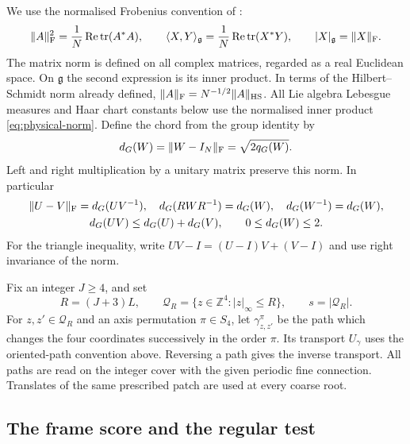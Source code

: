 \documentclass[11pt,reqno]{amsart}
\numberwithin{equation}{section}
\theoremstyle{definition}
\theoremstyle{remark}
\newcommand{\Z}{\mathbb Z}
\newcommand{\g}{\mathfrak g}
\DeclareMathOperator{\tr}{tr}
\begin{document}
We use the normalised Frobenius convention of
\cite[(7.1)--(7.3), p.~24]{Main}:
\begin{equation}
 \|A\|_{\rm F}^2=\frac1N\operatorname{Re}\tr(A^*A),\qquad
 \langle X,Y\rangle_{\g}=\frac1N\operatorname{Re}\tr(X^*Y),
 \qquad |X|_{\g}=\|X\|_{\rm F}.
 \label{eq:physical-norm}
\end{equation}
The matrix norm is defined on all complex matrices, regarded as a
real Euclidean space. On \(\g\) the second expression is its inner
product. In terms of the Hilbert--Schmidt norm already defined,
\(\|A\|_{\rm F}=N^{-1/2}\|A\|_{\rm HS}\).
All Lie algebra Lebesgue measures and Haar chart constants below
use the normalised inner product \eqref{eq:physical-norm}.
Define the chord from the group identity by
\begin{equation}
                  d_G(W)=\|W-I_N\|_{\rm F}=\sqrt{2q_G(W)}.
 \label{eq:chord}
\end{equation}
Left and right multiplication by a unitary matrix preserve this
norm. In particular
\begin{equation}
 \begin{gathered}
 \|U-V\|_{\rm F}=d_G(UV^{-1}),\quad
 d_G(RWR^{-1})=d_G(W),\quad d_G(W^{-1})=d_G(W),\\
 d_G(UV)\le d_G(U)+d_G(V),\qquad 0\le d_G(W)\le2.
 \end{gathered}
 \label{eq:chord-properties}
\end{equation}
For the triangle inequality, write \(UV-I=(U-I)V+(V-I)\)
and use right invariance of the norm.

Fix an integer \(J\ge4\), and set
\begin{equation}
       R=(J+3)L,\qquad
       \mathcal Q_R=\{z\in\Z^4:|z|_\infty\le R\},\qquad
       s=|\mathcal Q_R|.
 \label{eq:branch-patch}
\end{equation}
For \(z,z'\in\mathcal Q_R\) and an axis permutation
\(\pi\in S_4\), let \(\gamma^\pi_{z,z'}\) be the path which
changes the four coordinates successively in the order \(\pi\).
Its transport \(U_\gamma\) uses the oriented-path convention above.
Reversing a path gives the inverse transport.
All paths are read on the integer cover with the given periodic
fine connection. Translates of the same prescribed patch are used
at every coarse root.

\subsection{The frame score and the regular test}
\end{document}

